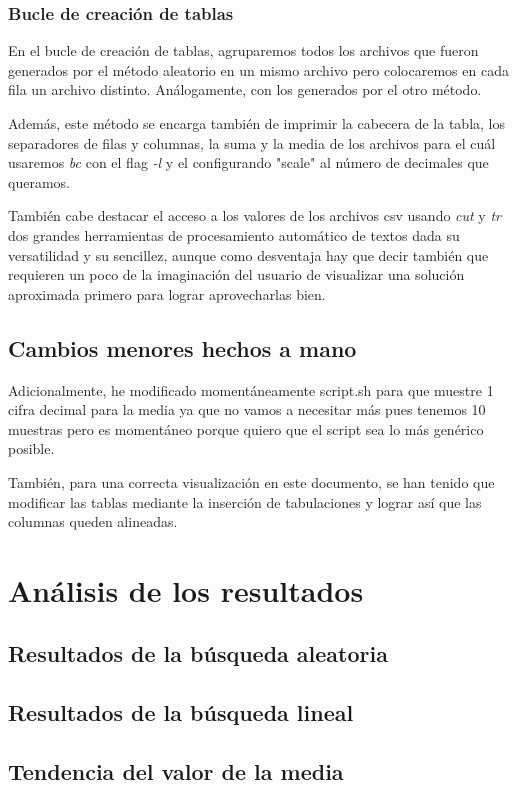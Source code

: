 \documentclass[a4paper, 11pt]{article}
\begin{document}
		\subsubsection{Bucle de creación de tablas}
			En el bucle de creación de tablas, agruparemos todos los archivos que fueron generados por el método aleatorio en
			un mismo archivo pero colocaremos en cada fila un archivo distinto. Análogamente, con los generados por el otro
			método.
			
			Además, este método se encarga también de imprimir la cabecera de la tabla, los separadores de filas y columnas,
			la suma y la media de los archivos para el cuál usaremos \textit{bc} con el flag \textit{-l} y el configurando
			"scale" al número de decimales que queramos.
			
			También cabe destacar el acceso a los valores de los archivos csv usando \textit{cut} y \textit{tr} dos grandes
			herramientas de procesamiento automático de textos dada su versatilidad y su sencillez, aunque como desventaja
			hay que decir también que requieren un poco de la imaginación del usuario de visualizar una solución aproximada
			primero para lograr aprovecharlas bien.

	\subsection{Cambios menores hechos a mano}
		Adicionalmente, he modificado momentáneamente script.sh para que muestre 1 cifra decimal para la media ya que no vamos a
		necesitar más pues tenemos 10 muestras pero es momentáneo porque quiero que el script sea lo más genérico posible.

		También, para una correcta visualización en este documento, se han tenido que modificar las tablas mediante la inserción
		de tabulaciones y lograr así que las columnas queden alineadas.
	

\section{Análisis de los resultados}
	\subsection{Resultados de la búsqueda aleatoria}
		\begin{scriptsize}
			
		\end{scriptsize}
	\subsection{Resultados de la búsqueda lineal}
			\begin{scriptsize}
				
			\end{scriptsize}
	
	\subsection{Tendencia del valor de la media}
\end{document}
